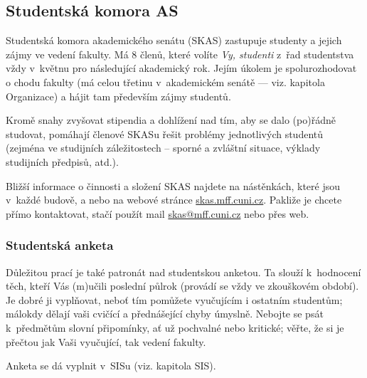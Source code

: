 \subsection[SKAS (Studentská komora akademického senátu)]{Studentská komora AS}
Studentská komora akademického senátu (SKAS) zastupuje studenty a jejich zájmy ve vedení fakulty. Má 8 členů, které volíte \emph{Vy, studenti} z~řad studentstva vždy v~květnu pro následující akademický rok. Jejím úkolem je spolurozhodovat o chodu fakulty (má celou třetinu v~akademickém senátě --- viz. kapitola Organizace) a hájit tam především zájmy studentů.

Kromě snahy zvyšovat stipendia a dohlížení nad tím, aby se dalo (po)řádně studovat, pomáhají členové SKASu řešit problémy jednotlivých studentů (zejména ve studijních záležitostech – sporné a zvláštní situace, výklady studijních předpisů, atd.). 

Bližší informace o činnosti a složení SKAS najdete na nástěnkách, které jsou v~každé budově, a nebo na webové stránce \url{skas.mff.cuni.cz}. Pakliže je chcete přímo kontaktovat, stačí použít mail \url{skas@mff.cuni.cz} nebo přes web.

\subsubsection{Studentská anketa}
Důležitou prací je také patronát nad studentskou anketou. Ta slouží k~hodnocení těch, kteří Vás (m)učili poslední půlrok (provádí se vždy ve zkouškovém období). Je dobré ji vyplňovat, neboť tím pomůžete vyučujícím i ostatním
studentům; málokdy dělají vaši cvičící a přednášející chyby
úmyslně. Nebojte se psát k~předmětům slovní připomínky, ať už
pochvalné nebo kritické; věřte, že si je přečtou jak Vaši
vyučující, tak vedení fakulty.

Anketa se dá vyplnit v~SISu (viz. kapitola SIS).
